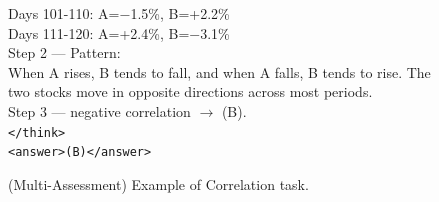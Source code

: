 \begin{figure}[h]
\begin{minipage}{0.95\textwidth}
{{\hspace{1em}Days 101-110: A=$-$1.5\%, B=+2.2\% \\
\hspace{1em}Days 111-120: A=+2.4\%, B=$-$3.1\% \\[6pt]
Step 2 --- Pattern: \\
When A rises, B tends to fall, and when A falls, B tends to rise. The two stocks move in opposite directions across most periods. \\[6pt]
Step 3 --- negative correlation $\rightarrow$ (B). \\[4pt]
\texttt{</think>} \\
\texttt{<answer>(B)</answer>}
}}
\end{minipage}
\caption{(Multi-Assessment) Example of Correlation task.}
\end{figure}

